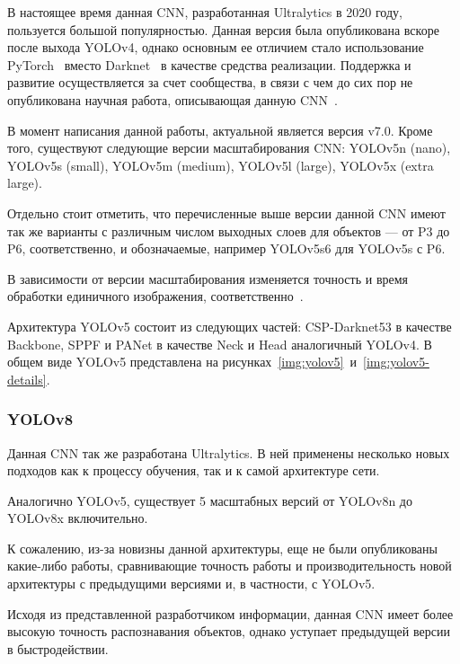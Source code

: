 В настоящее время данная CNN, разработанная Ultralytics в 2020 году, пользуется большой популярностью. Данная версия была опубликована вскоре после выхода YOLOv4, однако основным ее отличием стало использование PyTorch~\cite{pytorch} вместо Darknet~\cite{darknet} в качестве средства реализации. Поддержка и развитие осуществляется за счет сообщества, в связи с чем до сих пор не опубликована научная работа, описывающая данную CNN~\cite{yolo-review-2023}.

В момент написания данной работы, актуальной является версия v7.0. Кроме того, существуют следующие версии масштабирования CNN: YOLOv5n (nano), YOLOv5s (small), YOLOv5m (medium), YOLOv5l (large), YOLOv5x (extra large).

Отдельно стоит отметить, что перечисленные выше версии данной CNN имеют так же варианты с различным числом выходных слоев для объектов --- от P3 до P6, соответственно, и обозначаемые, например YOLOv5s6 для YOLOv5s с P6.

В зависимости от версии масштабирования изменяется точность и время обработки единичного изображения, соответственно~\cite{yolo-review-2023}.

Архитектура YOLOv5 состоит из следующих частей: CSP-Darknet53 в качестве Backbone, SPPF и PANet в качестве Neck и Head аналогичный YOLOv4. В общем виде YOLOv5 представлена на рисунках~\ref{img:yolov5}~и~\ref{img:yolov5-details}.



\subsubsection{YOLOv8}

Данная CNN так же разработана Ultralytics. В ней применены несколько новых подходов как к процессу обучения, так и к самой архитектуре сети.

Аналогично YOLOv5, существует 5 масштабных версий от YOLOv8n до YOLOv8x включительно.

К сожалению, из-за новизны данной архитектуры, еще не были опубликованы какие-либо работы, сравнивающие точность работы и производительность новой архитектуры с предыдущими версиями и, в частности, с YOLOv5.

Исходя из представленной разработчиком информации, данная CNN имеет более высокую точность распознавания объектов, однако уступает предыдущей версии в быстродействии.

